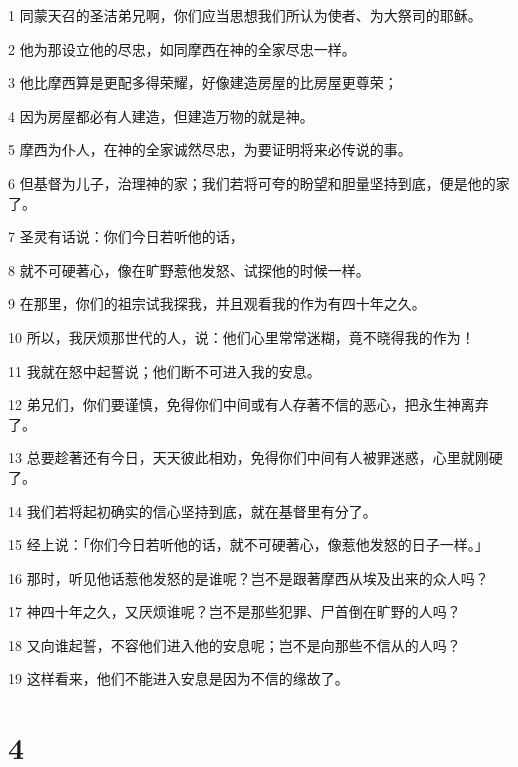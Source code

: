 \par 1 同蒙天召的圣洁弟兄啊，你们应当思想我们所认为使者、为大祭司的耶稣。
\par 2 他为那设立他的尽忠，如同摩西在神的全家尽忠一样。
\par 3 他比摩西算是更配多得荣耀，好像建造房屋的比房屋更尊荣；
\par 4 因为房屋都必有人建造，但建造万物的就是神。
\par 5 摩西为仆人，在神的全家诚然尽忠，为要证明将来必传说的事。
\par 6 但基督为儿子，治理神的家；我们若将可夸的盼望和胆量坚持到底，便是他的家了。
\par 7 圣灵有话说：你们今日若听他的话，
\par 8 就不可硬著心，像在旷野惹他发怒、试探他的时候一样。
\par 9 在那里，你们的祖宗试我探我，并且观看我的作为有四十年之久。
\par 10 所以，我厌烦那世代的人，说：他们心里常常迷糊，竟不晓得我的作为！
\par 11 我就在怒中起誓说；他们断不可进入我的安息。
\par 12 弟兄们，你们要谨慎，免得你们中间或有人存著不信的恶心，把永生神离弃了。
\par 13 总要趁著还有今日，天天彼此相劝，免得你们中间有人被罪迷惑，心里就刚硬了。
\par 14 我们若将起初确实的信心坚持到底，就在基督里有分了。
\par 15 经上说：「你们今日若听他的话，就不可硬著心，像惹他发怒的日子一样。」
\par 16 那时，听见他话惹他发怒的是谁呢？岂不是跟著摩西从埃及出来的众人吗？
\par 17 神四十年之久，又厌烦谁呢？岂不是那些犯罪、尸首倒在旷野的人吗？
\par 18 又向谁起誓，不容他们进入他的安息呢；岂不是向那些不信从的人吗？
\par 19 这样看来，他们不能进入安息是因为不信的缘故了。

\chapter{4}

